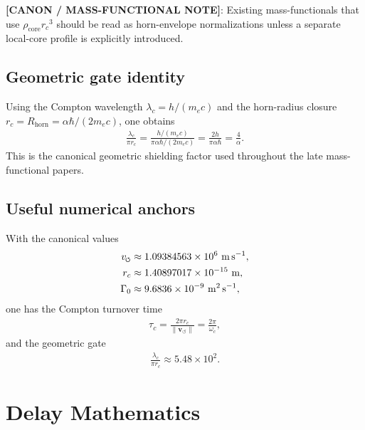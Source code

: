 \documentclass[11pt]{article}
\theoremstyle{definition}
\theoremstyle{plain}
\theoremstyle{remark}
\newcommand{\swirlarrow}{\mathchoice{\mkern-2mu\scriptstyle\boldsymbol{\circlearrowleft}}{\mkern-2mu\scriptstyle\boldsymbol{\circlearrowleft}}{\mkern-2mu\scriptscriptstyle\boldsymbol{\circlearrowleft}}{\mkern-2mu\scriptscriptstyle\boldsymbol{\circlearrowleft}}}
\newcommand{\rc}{{r_c}}
\newcommand{\vnorm}{\lVert \mathbf{v}_{\!\boldsymbol{\circlearrowleft}} \rVert}
\begin{document}
            \textbf{[CANON / MASS-FUNCTIONAL NOTE]}: Existing mass-functionals that use $\rho_{\mathrm{core}}\rc^3$ should be read as horn-envelope normalizations unless a separate local-core profile is explicitly introduced.

        \subsection{Geometric gate identity}
            Using the Compton wavelength $\lambda_c = h/(m_e c)$ and the horn-radius closure $r_c=R_{\mathrm{horn}} = \alpha\hbar/(2m_e c)$, one obtains
            \begin{align}
                \frac{\lambda_c}{\pi r_c}
                =
                \frac{h/(m_e c)}{\pi \alpha \hbar /(2m_e c)}
                =
                \frac{2h}{\pi \alpha \hbar}
                =
                \frac{4}{\alpha}.
            \end{align}
            This is the canonical geometric shielding factor used throughout the late mass-functional papers.

        \subsection{Useful numerical anchors}
            With the canonical values
            \begin{align}
                v_{\swirlarrow} &\approx 1.09384563\times 10^6\ \mathrm{m\,s^{-1}}, \\
                r_c &\approx 1.40897017\times 10^{-15}\ \mathrm{m}, \\
                \Gamma_0 &\approx 9.6836\times 10^{-9}\ \mathrm{m^2\,s^{-1}},
            \end{align}
            one has the Compton turnover time
            \begin{align}
                \tau_c = \frac{2\pi \rc}{\vnorm} = \frac{2\pi}{\omega_c},
            \end{align}
            and the geometric gate
            \begin{align}
                \frac{\lambda_c}{\pi \rc} \approx 5.48\times 10^2.
            \end{align}

    \section{Delay Mathematics}
        \label{sec:appendix_delay}
\end{document}
